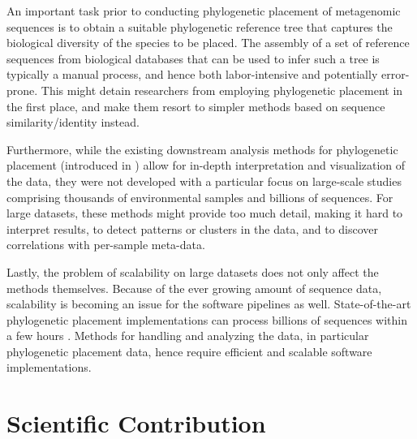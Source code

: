 An important task prior to conducting phylogenetic placement of metagenomic sequences is to obtain a suitable
phylogenetic reference tree that captures the biological diversity of the species to be placed.
The assembly of a set of reference sequences from biological databases that can be used to infer such a tree
is typically a manual process, and hence both labor-intensive and potentially error-prone.
This might detain researchers from employing phylogenetic placement in the first place,
and make them resort to simpler methods based on sequence similarity/identity instead.

Furthermore, while the existing downstream analysis methods for phylogenetic placement
(introduced in )
allow for in-depth interpretation and visualization of the data,
they were not developed with a particular focus on large-scale studies
comprising thousands of environmental samples and billions of sequences.
For large datasets, these methods might provide too much detail,
making it hard to interpret results, to detect patterns or clusters in the data,
and to discover correlations with per-sample meta-data.

Lastly, the problem of scalability on large datasets does not only affect the methods themselves.
Because of the ever growing amount of sequence data,
scalability is becoming an issue for the software pipelines as well.
State-of-the-art phylogenetic placement implementations can process billions of sequences within a few hours \cite{Barbera2018}.
Methods for handling and analyzing the data, in particular phylogenetic placement data,
hence require efficient and scalable software implementations.



\section{Scientific Contribution}
\label{ch:Introduction:sec:ContributionOverview}

